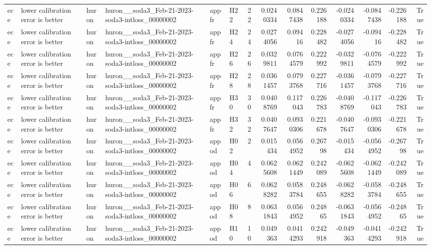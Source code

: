 \begin{longtable}{llllllrrrrrrrr}
ece & lower calibration error is better & huron & huron\_\_soda3\_Feb-21-2023-soda3-intloss\_00000002 & appfr & H22 & 22 & 0.0240334 & 0.0847438 & 0.226188 & -0.0240334 & -0.0847438 & -0.226188 & True \\
ece & lower calibration error is better & huron & huron\_\_soda3\_Feb-21-2023-soda3-intloss\_00000002 & appfr & H24 & 24 & 0.0274056 & 0.09416 & 0.228482 & -0.0274056 & -0.09416 & -0.228482 & True \\
ece & lower calibration error is better & huron & huron\_\_soda3\_Feb-21-2023-soda3-intloss\_00000002 & appfr & H26 & 26 & 0.0329811 & 0.0764579 & 0.222992 & -0.0329811 & -0.0764579 & -0.222992 & True \\
ece & lower calibration error is better & huron & huron\_\_soda3\_Feb-21-2023-soda3-intloss\_00000002 & appfr & H28 & 28 & 0.0361457 & 0.0793768 & 0.227716 & -0.0361457 & -0.0793768 & -0.227716 & True \\
ece & lower calibration error is better & huron & huron\_\_soda3\_Feb-21-2023-soda3-intloss\_00000002 & appfr & H30 & 30 & 0.0408769 & 0.117043 & 0.226783 & -0.0408769 & -0.117043 & -0.226783 & True \\
ece & lower calibration error is better & huron & huron\_\_soda3\_Feb-21-2023-soda3-intloss\_00000002 & appfr & H32 & 32 & 0.0407647 & 0.0930306 & 0.221678 & -0.0407647 & -0.0930306 & -0.221678 & True \\
ece & lower calibration error is better & huron & huron\_\_soda3\_Feb-21-2023-soda3-intloss\_00000002 & appod & H02 & 2 & 0.015434 & 0.0564952 & 0.26798 & -0.015434 & -0.0564952 & -0.26798 & True \\
ece & lower calibration error is better & huron & huron\_\_soda3\_Feb-21-2023-soda3-intloss\_00000002 & appod & H04 & 4 & 0.0625608 & 0.0621449 & 0.242089 & -0.0625608 & -0.0621449 & -0.242089 & True \\
ece & lower calibration error is better & huron & huron\_\_soda3\_Feb-21-2023-soda3-intloss\_00000002 & appod & H06 & 6 & 0.0628282 & 0.0583784 & 0.248655 & -0.0628282 & -0.0583784 & -0.248655 & True \\
ece & lower calibration error is better & huron & huron\_\_soda3\_Feb-21-2023-soda3-intloss\_00000002 & appod & H08 & 8 & 0.0631843 & 0.0564952 & 0.24865 & -0.0631843 & -0.0564952 & -0.24865 & True \\
ece & lower calibration error is better & huron & huron\_\_soda3\_Feb-21-2023-soda3-intloss\_00000002 & appod & H10 & 10 & 0.049363 & 0.0414293 & 0.242918 & -0.049363 & -0.0414293 & -0.242918 & True \\

\end{longtable}
